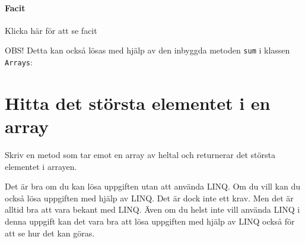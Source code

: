 \hypertarget{cb2}{}
\begin{Shaded}
\begin{Highlighting}[]
\end{Highlighting}
\end{Shaded}

\hypertarget{facit}{%
\paragraph{Facit}\label{facit}}

Klicka här för att se facit

\hypertarget{cb3}{}
\begin{Shaded}
\begin{Highlighting}[]
\OperatorTok{=} \OperatorTok{;}
 \OperatorTok{(}\OperatorTok{=} \OperatorTok{;}\OperatorTok{\textless{}}\OperatorTok{;}\OperatorTok{++)} \OperatorTok{\{}
\OperatorTok{+=}\OperatorTok{[}\OperatorTok{];}
\OperatorTok{\}}
\OperatorTok{;}
\end{Highlighting}
\end{Shaded}

OBS! Detta kan också lösas med hjälp av den inbyggda metoden
\texttt{sum} i klassen \texttt{Arrays}:

\hypertarget{cb4}{}
\begin{Shaded}
\begin{Highlighting}[]
 \OperatorTok{(}\OperatorTok{();}
\end{Highlighting}
\end{Shaded}

\hypertarget{hitta-det-stuxf6rsta-elementet-i-en-array}{%
\section{Hitta det största elementet i en
array}\label{hitta-det-stuxf6rsta-elementet-i-en-array}}

Skriv en metod som tar emot en array av heltal och returnerar det
största elementet i arrayen.

Det är bra om du kan lösa uppgiften utan att använda LINQ. Om du vill
kan du också lösa uppgiften med hjälp av LINQ. Det är dock inte ett
krav. Men det är alltid bra att vara bekant med LINQ. Även om du helst
inte vill använda LINQ i denna uppgift kan det vara bra att lösa
uppgiften med hjälp av LINQ också för att se hur det kan göras.

